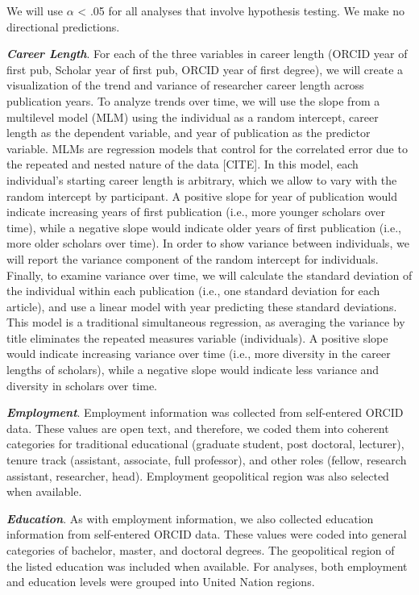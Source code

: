 \documentclass[
  english,
  man]{apa6}
\begin{document}
We will use \(\alpha\) \textless{} .05 for all analyses that involve hypothesis testing. We make no directional predictions.

\textbf{\emph{Career Length}}. For each of the three variables in career length (ORCID year of first pub, Scholar year of first pub, ORCID year of first degree), we will create a visualization of the trend and variance of researcher career length across publication years. To analyze trends over time, we will use the slope from a multilevel model (MLM) using the individual as a random intercept, career length as the dependent variable, and year of publication as the predictor variable. MLMs are regression models that control for the correlated error due to the repeated and nested nature of the data {[}CITE{]}. In this model, each individual's starting career length is arbitrary, which we allow to vary with the random intercept by participant. A positive slope for year of publication would indicate increasing years of first publication (i.e., more younger scholars over time), while a negative slope would indicate older years of first publication (i.e., more older scholars over time). In order to show variance between individuals, we will report the variance component of the random intercept for individuals. Finally, to examine variance over time, we will calculate the standard deviation of the individual within each publication (i.e., one standard deviation for each article), and use a linear model with year predicting these standard deviations. This model is a traditional simultaneous regression, as averaging the variance by title eliminates the repeated measures variable (individuals). A positive slope would indicate increasing variance over time (i.e., more diversity in the career lengths of scholars), while a negative slope would indicate less variance and diversity in scholars over time.

\textbf{\emph{Employment}}. Employment information was collected from self-entered ORCID data. These values are open text, and therefore, we coded them into coherent categories for traditional educational (graduate student, post doctoral, lecturer), tenure track (assistant, associate, full professor), and other roles (fellow, research assistant, researcher, head). Employment geopolitical region was also selected when available.

\textbf{\emph{Education}}. As with employment information, we also collected education information from self-entered ORCID data. These values were coded into general categories of bachelor, master, and doctoral degrees. The geopolitical region of the listed education was included when available. For analyses, both employment and education levels were grouped into United Nation regions.
\end{document}
